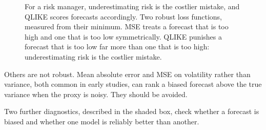 \begin{figure}[htbp]
\centering
{}
\caption{For a risk manager, underestimating risk is the costlier mistake, and QLIKE scores forecasts accordingly. Two robust loss functions, measured from their minimum. MSE treats a forecast that is too high and one that is too low symmetrically. QLIKE punishes a forecast that is too low far more than one that is too high: underestimating risk is the costlier mistake.}
\label{fig:10-qlike}
\end{figure}

Others are not robust. Mean absolute error and MSE on volatility rather than variance, both common in early studies, can rank a biased forecast above the true variance when the proxy is noisy. They should be avoided.

Two further diagnostics, described in the shaded box, check whether a forecast is biased and whether one model is reliably better than another.

